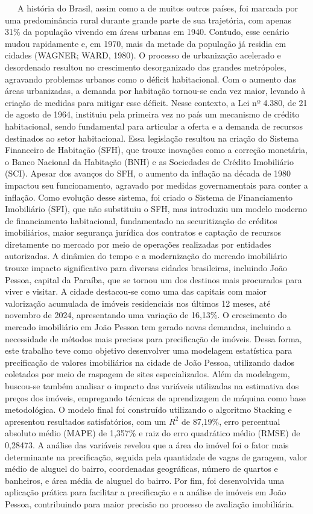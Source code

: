 \documentclass[
  12pt,
  a4paper,
]{scrreprt}
\begin{document}
~~~A história do Brasil, assim como a de muitos outros países, foi
marcada por uma predominância rural durante grande parte de sua
trajetória, com apenas 31\% da população vivendo em áreas urbanas em
1940. Contudo, esse cenário mudou rapidamente e, em 1970, mais da metade
da população já residia em cidades (WAGNER; WARD, 1980). O processo de
urbanização acelerado e desordenado resultou no crescimento
desorganizado das grandes metrópoles, agravando problemas urbanos como o
déficit habitacional. Com o aumento das áreas urbanizadas, a demanda por
habitação tornou-se cada vez maior, levando à criação de medidas para
mitigar esse déficit. Nesse contexto, a Lei nº 4.380, de 21 de agosto de
1964, instituiu pela primeira vez no país um mecanismo de crédito
habitacional, sendo fundamental para articular a oferta e a demanda de
recursos destinados ao setor habitacional. Essa legislação resultou na
criação do Sistema Financeiro de Habitação (SFH), que trouxe inovações
como a correção monetária, o Banco Nacional da Habitação (BNH) e as
Sociedades de Crédito Imobiliário (SCI). Apesar dos avanços do SFH, o
aumento da inflação na década de 1980 impactou seu funcionamento,
agravado por medidas governamentais para conter a inflação. Como
evolução desse sistema, foi criado o Sistema de Financiamento
Imobiliário (SFI), que não substituiu o SFH, mas introduziu um modelo
moderno de financiamento habitacional, fundamentado na securitização de
créditos imobiliários, maior segurança jurídica dos contratos e captação
de recursos diretamente no mercado por meio de operações realizadas por
entidades autorizadas. A dinâmica do tempo e a modernização do mercado
imobiliário trouxe impacto significativo para diversas cidades
brasileiras, incluindo João Pessoa, capital da Paraíba, que se tornou um
dos destinos mais procurados para viver e visitar. A cidade destacou-se
como uma das capitais com maior valorização acumulada de imóveis
residenciais nos últimos 12 meses, até novembro de 2024, apresentando
uma variação de 16,13\%. O crescimento do mercado imobiliário em João
Pessoa tem gerado novas demandas, incluindo a necessidade de métodos
mais precisos para precificação de imóveis. Dessa forma, este trabalho
teve como objetivo desenvolver uma modelagem estatística para
precificação de valores imobiliários na cidade de João Pessoa,
utilizando dados coletados por meio de raspagem de sites especializados.
Além da modelagem, buscou-se também analisar o impacto das variáveis
utilizadas na estimativa dos preços dos imóveis, empregando técnicas de
aprendizagem de máquina como base metodológica. O modelo final foi
construído utilizando o algoritmo Stacking e apresentou resultados
satisfatórios, com um \(R^2\) de 87,19\%, erro percentual absoluto médio
(MAPE) de 1,357\% e raiz do erro quadrático médio (RMSE) de 0,28473. A
análise das variáveis revelou que a área do imóvel foi o fator mais
determinante na precificação, seguida pela quantidade de vagas de
garagem, valor médio de aluguel do bairro, coordenadas geográficas,
número de quartos e banheiros, e área média de aluguel do bairro. Por
fim, foi desenvolvida uma aplicação prática para facilitar a
precificação e a análise de imóveis em João Pessoa, contribuindo para
maior precisão no processo de avaliação imobiliária.
\end{document}
